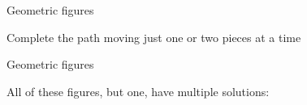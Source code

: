 \documentclass[14pt]{beamer}
\begin{document}
\begin{frame}{Geometric figures}
\begin{center}
            \smallskip

            {\small Complete the path moving just one or two pieces at a time}
        \end{center}
    \end{frame}


    \begin{frame}{Geometric figures}

        \vspace{-1em}
        \begin{center}

            \bigskip

            {\normalsize All of these figures, but one, have multiple solutions:}

            \bigskip\medskip


\end{center}
\end{frame}
\end{document}

